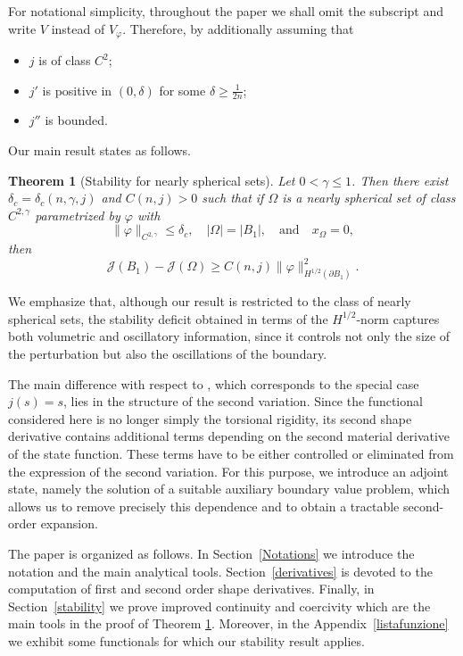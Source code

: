 \documentclass[oneside,a4paper,11pt,notitlepage]{article}
\newcommand{\abs}[1]{{\left|#1\right|}}
\theoremstyle{definition}
\theoremstyle{plain}
\newtheorem{theorem}{Theorem}[section]
\theoremstyle{definition}
\begin{document}
For notational simplicity, throughout the paper we shall omit the subscript and write $V$ instead of $V_\varphi$. Therefore, by additionally assuming that
\begin{itemize}
    \item $j$ is of class $C^2$;
    \item $j'$ is positive in $(0,\delta)$ for some $\delta\geq\frac{1}{2n}$;
    \item $j''$ is bounded.
\end{itemize}
Our main result states as follows.
\begin{theorem}[Stability for nearly spherical sets]\label{MainTh}
    Let $0<\gamma\leq1$. Then there exist $\delta_c=\delta_c(n,\gamma,j)$ and $C(n,j)>0$ such that if $\Omega$ is a nearly spherical set of class $C^{2,\gamma}$ parametrized by $\varphi$ with 
    \begin{equation*}
        \|\varphi\|_{C^{2,\gamma}}\leq\delta_c,\quad \abs{\Omega}=\abs{B_1}, \quad \text{and}\quad x_\Omega=0,
    \end{equation*}
    then 
    \begin{equation*}
        \mathcal{J}(B_1)-\mathcal{J}(\Omega)\geq C(n,j)\|\varphi\|_{H^{1/2}(\partial B_1)}^2.
    \end{equation*}
\end{theorem}
We emphasize that, although our result is restricted to the class of nearly spherical sets, the stability deficit obtained in terms of the $H^{1/2}$-norm captures both volumetric and oscillatory information, since it controls not only the size of the perturbation but also the oscillations of the boundary.

The main difference with respect to \cite{BDPV}, which corresponds to the special case $j(s)=s$, lies in the structure of the second variation. Since the functional considered here is no longer simply the torsional rigidity, its second shape derivative contains additional terms depending on the second material derivative of the state function. These terms have to be either controlled or eliminated from the expression of the second variation. For this purpose, we introduce an adjoint state, namely the solution of a suitable auxiliary boundary value problem, which allows us to remove precisely this dependence and to obtain a tractable second-order expansion.

The paper is organized as follows. In Section~\ref{Notations} we introduce the notation and the main analytical tools. Section~\ref{derivatives} is devoted to the computation of first and second order shape derivatives. Finally, in Section~\ref{stability} we prove improved continuity and coercivity which are the main tools in the proof of Theorem \ref{MainTh}. Moreover, in the Appendix~\ref{listafunzione} we exhibit some functionals for which our stability result applies.
\end{document}

